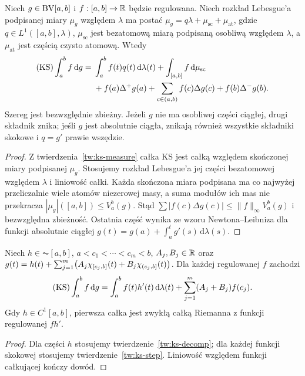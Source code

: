 \begin{twierdzenie}
\label{tw:ks-decomp}
Niech $g\in\mathrm{BV}[a,b]$ i $f:[a,b]\to\mathbb R$ będzie regulowana. Niech rozkład Lebesgue'a podpisanej miary $\mu_g$ względem $\lambda$ ma postać
$\mu_g=q\lambda+\mu_{\mathrm{sc}}+\mu_{\mathrm{at}}$, gdzie $q\in L^1([a,b],\lambda)$, $\mu_{\mathrm{sc}}$ jest bezatomową miarą podpisaną osobliwą względem $\lambda$, a $\mu_{\mathrm{at}}$ jest częścią czysto atomową. Wtedy
\[
 \begin{aligned}
 (\mathrm{KS})\int_a^b f\,\mathrm dg
 ={}&\int_a^b f(t)q(t)\,\mathrm d\lambda(t)
 +\int_{[a,b]}f\,\mathrm d\mu_{\mathrm{sc}}\\
 &+f(a)\Delta^+g(a)+\sum_{c\in(a,b)}f(c)\Delta g(c)
 +f(b)\Delta^-g(b).
 \end{aligned}
\]
Szereg jest bezwzględnie zbieżny. Jeżeli $g$ nie ma osobliwej części ciągłej, drugi składnik znika; jeśli $g$ jest absolutnie ciągła, znikają również wszystkie składniki skokowe i $q=g'$ prawie wszędzie.
\end{twierdzenie}
\begin{proof}
Z twierdzenia~\ref{tw:ks-measure} całka KS jest całką względem skończonej miary podpisanej $\mu_g$. Stosujemy rozkład Lebesgue'a jej części bezatomowej względem $\lambda$ i liniowość całki. Każda skończona miara podpisana ma co najwyżej przeliczalnie wiele atomów niezerowej masy, a suma modułów ich mas nie przekracza $|\mu_g|([a,b])\le V_a^b(g)$. Stąd $\sum|f(c)\Delta g(c)|\le\|f\|_\infty V_a^b(g)$ i bezwzględna zbieżność. Ostatnia część wynika ze wzoru Newtona--Leibniza dla funkcji absolutnie ciągłej $g(t)=g(a)+\int_a^t g'(s)\,\mathrm d\lambda(s)$.
\end{proof}

\begin{wniosek}
\label{wn:ks-ac-jumps}
Niech $h\in\AC[a,b]$, $a<c_1<\cdots<c_m<b$, $A_j,B_j\in\mathbb R$ oraz
$g(t)=h(t)+\sum_{j=1}^m\bigl(A_j\chi_{[c_j,b]}(t)+B_j\chi_{(c_j,b]}(t)\bigr)$. Dla każdej regulowanej $f$ zachodzi
\[
 (\mathrm{KS})\int_a^b f\,\mathrm dg
 =\int_a^b f(t)h'(t)\,\mathrm d\lambda(t)
 +\sum_{j=1}^m(A_j+B_j)f(c_j).
\]
Gdy $h\in C^1[a,b]$, pierwsza całka jest zwykłą całką Riemanna z funkcji regulowanej $fh'$.
\end{wniosek}
\begin{proof}
Dla części $h$ stosujemy twierdzenie~\ref{tw:ks-decomp}; dla każdej funkcji skokowej stosujemy twierdzenie~\ref{tw:ks-step}. Liniowość względem funkcji całkującej kończy dowód.
\end{proof}

